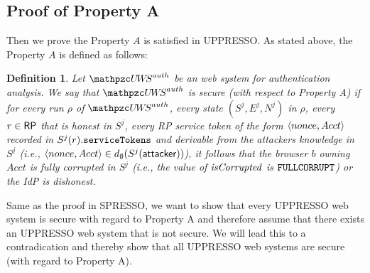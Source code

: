 \documentclass[letterpaper,onecolumn,10pt]{article}
\newtheorem{definition}{Definition}
\begin{document}
\subsection{Proof of Property A}
Then we prove the Property $A$ is satisfied in UPPRESSO.
As stated above, the Property $A$ is defined as follows:
\begin{definition}\label{def:uppresso-security-property} 
  Let $\uppressoauthwebsystem$ be an \uppresso web system 
  for authentication analysis. We say that 
  \emph{$\uppressoauthwebsystem$ is secure 
  (with respect to Property A)} if for every run $\rho$ of 
  $\uppressoauthwebsystem$, every state $(S^j, E^j, N^j)$ in 
  $\rho$, every $r\in \mathsf{RP}$ that is honest in $S^j$, 
  every RP service token of the form $\langle {{}nonce, Acct} \rangle$ 
  recorded in $S^j(r).\mathtt{serviceTokens}$ and derivable 
  from the attackers knowledge in $S^j$ (i.e., 
  $\langle {{}nonce, Acct} \rangle \in 
  d_{\emptyset}(S^j(\mathsf{attacker}))$), it follows that the 
  browser $b$ owning $Acct$ is fully corrupted in $S^j$ 
  (i.e., the value of $\mathit{isCorrupted}$ is $\mathtt{FULLCORRUPT}$) 
  or the IdP is dishonest. 
\end{definition}



Same as the proof in SPRESSO, we want to show that every UPPRESSO web system is secure with regard to Property A and therefore assume that there exists an UPPRESSO web system that is not secure. We will lead this to a contradication and thereby show that all UPPRESSO web systems are secure (with regard to Property A).

\end{document}
